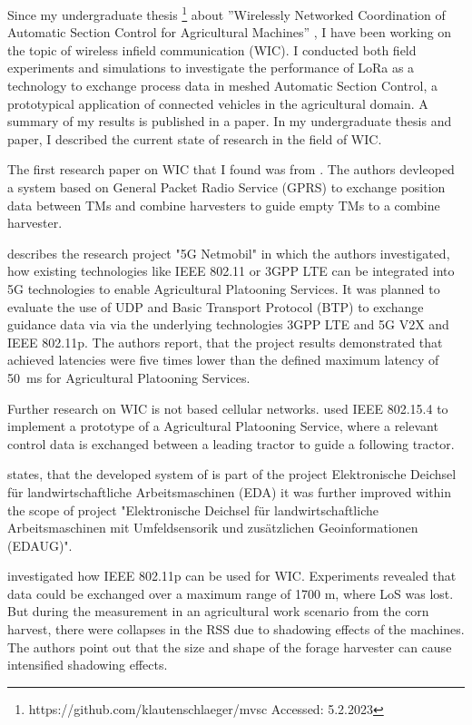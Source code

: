 Since my undergraduate thesis \footnote{https://github.com/klautenschlaeger/mvsc Accessed: 5.2.2023} about ”Wirelessly Networked Coordination of Automatic Section Control for Agricultural Machines”
, I have been working on the topic of wireless infield communication (WIC). I conducted both field experiments and
simulations to investigate the performance of LoRa as a technology to exchange process data in
meshed Automatic Section Control, a prototypical application of connected vehicles in the agricultural domain.
A summary of my results is published in a paper\cite{Beyond}.
In my undergraduate thesis and paper, I described the current state of research in the field of WIC.

The first research paper on WIC that I found was from \textcite{ALI GPS}. The authors
devleoped a system based on General Packet Radio Service (GPRS) to exchange position data between \ac{TM}s and combine
harvesters to guide empty \ac{TM}s to a combine harvester.

\textcite{smolnik_5g_2020} describes the research project "5G Netmobil" in which the authors investigated, how existing technologies like
IEEE 802.11 or 3GPP LTE can be integrated into 5G technologies to enable Agricultural Platooning Services. It was planned to evaluate the use of \ac{UDP} and Basic Transport Protocol (BTP) to exchange guidance data via
via the underlying technologies 3GPP LTE and 5G V2X and IEEE 802.11p. The authors report, that the project results demonstrated that achieved
latencies were five times lower than the defined maximum latency of \SI{50}{\milli\second} for Agricultural Platooning Services. 

Further research on \ac{WIC} is not based cellular networks. \cite{FendtPlatoon} used IEEE 802.15.4 to implement a
prototype of a Agricultural Platooning Service, where a relevant control data is exchanged between a leading tractor
to guide a following tractor.

\textcite{smolnik_5g_2020} states, that the developed system of \textcite{FendtPlatoon} is part
of the project Elektronische Deichsel für landwirtschaftliche Arbeitsmaschinen (EDA) 
it was further improved within the scope of project "Elektronische Deichsel für landwirtschaftliche Arbeitsmaschinen mit Umfeldsensorik und zusätzlichen Geoinformationen (EDAUG)".


\textcite{klingler_agriculture_2018} investigated how IEEE 802.11p can be used for \ac{WIC}. Experiments revealed
that data could be exchanged over a maximum range of 1700 m, where \ac{LoS} was lost. But during the
measurement in an agricultural work scenario from the corn harvest, there were collapses in the \ac{RSS}
due to shadowing effects of the machines. The authors point out that the size and shape of the forage harvester
can cause intensified shadowing effects.

